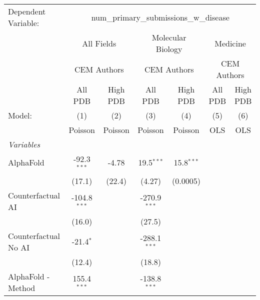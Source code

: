 \begingroup
\centering
\begin{tabular}{lcccccc}
   \tabularnewline \midrule \midrule
   Dependent Variable: & \multicolumn{6}{c}{num\_primary\_submissions\_w\_disease}\\
 & \multicolumn{2}{c}{All Fields} & \multicolumn{2}{c}{Molecular Biology} & \multicolumn{2}{c}{Medicine} \\
\cmidrule(lr){2-3} \cmidrule(lr){4-5} \cmidrule(lr){6-7}
 & \multicolumn{2}{c}{CEM Authors} & \multicolumn{2}{c}{CEM Authors} & \multicolumn{2}{c}{CEM Authors} \\
\cmidrule(lr){2-3} \cmidrule(lr){4-5} \cmidrule(lr){6-7}
 & \multicolumn{1}{c}{All PDB} & \multicolumn{1}{c}{High PDB} & \multicolumn{1}{c}{All PDB} & \multicolumn{1}{c}{High PDB} & \multicolumn{1}{c}{All PDB} & \multicolumn{1}{c}{High PDB} \\
\cmidrule(lr){2-2} \cmidrule(lr){3-3} \cmidrule(lr){4-4} \cmidrule(lr){5-5} \cmidrule(lr){6-6} \cmidrule(lr){7-7}
   Model:                                                     & (1)            & (2)     & (3)            & (4)          & (5)  & (6)\\  
                                                              &  Poisson       & Poisson & Poisson        & Poisson      & OLS  & OLS\\  
   \midrule
   \emph{Variables}\\
   AlphaFold                                                  & -92.3$^{***}$  & -4.78   & 19.5$^{***}$   & 15.8$^{***}$ &      &   \\   
                                                              & (17.1)         & (22.4)  & (4.27)         & (0.0005)     &      &   \\   
   Counterfactual AI                                          & -104.8$^{***}$ &         & -270.9$^{***}$ &              &      &   \\   
                                                              & (16.0)         &         & (27.5)         &              &      &   \\   
   Counterfactual No AI                                       & -21.4$^{*}$    &         & -288.1$^{***}$ &              &      &   \\   
                                                              & (12.4)         &         & (18.8)         &              &      &   \\   
   AlphaFold - Method                                         & 155.4$^{***}$  &         & -138.8$^{***}$ &              &      &   \\   

\end{tabular}
